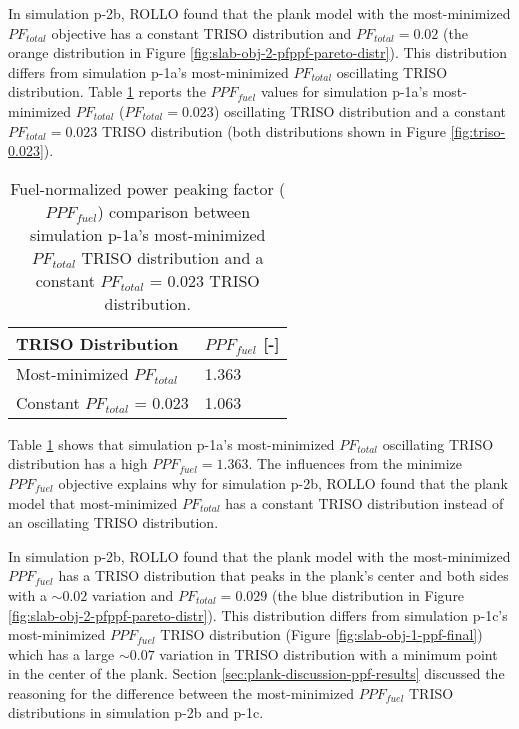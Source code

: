 In simulation p-2b, \gls{ROLLO} found that the plank model with the most-minimized 
$PF_{total}$ objective has a constant TRISO distribution and $PF_{total} = 0.02$
(the orange distribution in Figure \ref{fig:slab-obj-2-pfppf-pareto-distr}). 
This distribution differs from simulation p-1a's most-minimized $PF_{total}$ oscillating 
TRISO distribution. 
Table \ref{tab:0.023-plank-ppf} reports the $PPF_{fuel}$ values for simulation p-1a's 
most-minimized $PF_{total}$ ($PF_{total} = 0.023$) oscillating TRISO distribution and 
a constant $PF_{total} = 0.023$ TRISO distribution (both distributions shown 
in Figure \ref{fig:triso-0.023}).
\begin{table}[htbp!]
    \centering
    \onehalfspacing
    \caption{Fuel-normalized power peaking factor ($PPF_{fuel}$) comparison between  
    simulation p-1a's most-minimized $PF_{total}$ TRISO distribution and a 
    constant $PF_{total}$ = 0.023 TRISO distribution.}
	\label{tab:0.023-plank-ppf}
    \footnotesize
    \begin{tabular}{ll}
    \hline
    \textbf{TRISO Distribution} & \textbf{$PPF_{fuel}$ [-]} \\
    \hline 
    Most-minimized $PF_{total}$ & 1.363 \\
    Constant $PF_{total}$ = 0.023 & 1.063 \\
    \hline
    \end{tabular}
\end{table}

Table \ref{tab:0.023-plank-ppf} shows that simulation p-1a's most-minimized $PF_{total}$ 
oscillating TRISO distribution has a high $PPF_{fuel} = 1.363$.
The influences from the minimize $PPF_{fuel}$ objective explains why for simulation p-2b, 
\gls{ROLLO} found that the plank model that most-minimized $PF_{total}$ has a 
constant TRISO distribution instead of an oscillating TRISO distribution.

In simulation p-2b, \gls{ROLLO} found that the plank model with the most-minimized 
$PPF_{fuel}$ has a TRISO distribution that peaks in the plank's center and both sides 
with a $\sim0.02$ variation and $PF_{total}=0.029$ (the blue distribution in Figure 
\ref{fig:slab-obj-2-pfppf-pareto-distr}). 
This distribution differs from simulation p-1c's most-minimized $PPF_{fuel}$ TRISO 
distribution (Figure \ref{fig:slab-obj-1-ppf-final}) which has a large $\sim 0.07$ 
variation in TRISO distribution with a minimum point in the center of the plank. 
Section \ref{sec:plank-discussion-ppf-results} discussed the reasoning for the 
difference between the most-minimized $PPF_{fuel}$ TRISO distributions in 
simulation p-2b and p-1c. 

